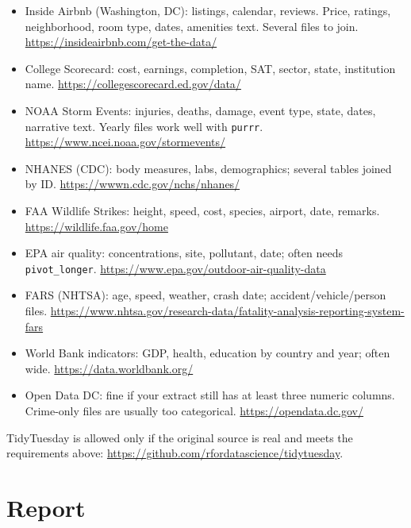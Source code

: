 \documentclass[11pt, a4paper]{article}
\begin{document}
\begin{itemize}
    \item Inside Airbnb (Washington, DC): listings, calendar, reviews. Price, ratings, neighborhood, room type, dates, amenities text. Several files to join. \url{https://insideairbnb.com/get-the-data/}

    \item College Scorecard: cost, earnings, completion, SAT, sector, state, institution name. \url{https://collegescorecard.ed.gov/data/}

    \item NOAA Storm Events: injuries, deaths, damage, event type, state, dates, narrative text. Yearly files work well with \texttt{purrr}. \url{https://www.ncei.noaa.gov/stormevents/}

    \item NHANES (CDC): body measures, labs, demographics; several tables joined by ID. \url{https://wwwn.cdc.gov/nchs/nhanes/}

    \item FAA Wildlife Strikes: height, speed, cost, species, airport, date, remarks. \url{https://wildlife.faa.gov/home}

    \item EPA air quality: concentrations, site, pollutant, date; often needs \texttt{pivot\_longer}. \url{https://www.epa.gov/outdoor-air-quality-data}

    \item FARS (NHTSA): age, speed, weather, crash date; accident/vehicle/person files. \url{https://www.nhtsa.gov/research-data/fatality-analysis-reporting-system-fars}

    \item World Bank indicators: GDP, health, education by country and year; often wide. \url{https://data.worldbank.org/}

    \item Open Data DC: fine if your extract still has at least three numeric columns. Crime-only files are usually too categorical. \url{https://opendata.dc.gov/}
\end{itemize}

TidyTuesday is allowed only if the original source is real and meets the requirements above: \url{https://github.com/rfordatascience/tidytuesday}.

\section*{Report}
\end{document}
